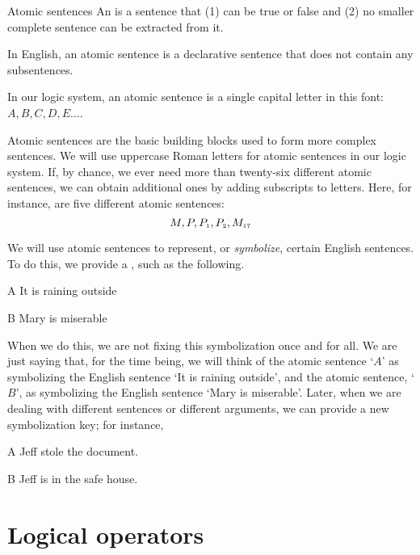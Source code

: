 \begin{factboxy}{Atomic sentences}
An  is a sentence that (1) can be true or false and (2) no smaller complete sentence can be extracted from it.\medskip

In English, an atomic sentence is a declarative sentence that does not contain any subsentences.\smallskip

In our logic system, an atomic sentence is a single capital letter in this font: $A, B, C, D, E . . .$.
\end{factboxy}

Atomic sentences are the basic building blocks used to form more complex sentences. We will use uppercase Roman letters for atomic sentences in our logic system. If, by chance, we ever need more than twenty-six different atomic sentences, we can obtain additional ones by adding subscripts to letters. Here, for instance, are five different atomic sentences:
	$$M, P, P_{\text{\tiny 1}}, P_{\text{\tiny 2}}, M_{\text{\tiny 17}}$$

We will use atomic sentences to represent, or \emph{symbolize}, certain English sentences. To do this, we provide a , such as the following.
	\begin{ekey}
		\item[A] It is raining outside
		\item[B] Mary is miserable
	\end{ekey}
When we do this, we are not fixing this symbolization once and for all. We are just saying that, for the time being, we will think of the atomic sentence `$A$' as symbolizing the English sentence `It is raining outside', and the atomic sentence, `$B$', as symbolizing the English sentence `Mary is miserable'. Later, when we are dealing with different sentences or different arguments, we can provide a new symbolization key; for instance, 
	\begin{ekey}
		\item[A] Jeff stole the document.
		\item[B] Jeff is in the safe house.
	\end{ekey}






\chapter{Logical operators}
\label{s:TFLConnectives}

